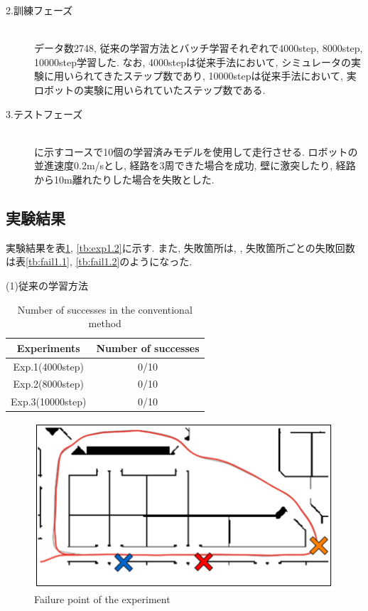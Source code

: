 \newpage
\begin{description}
  \item[2.訓練フェーズ]\mbox{}\\データ数2748, 従来の学習方法とバッチ学習それぞれで4000step, 8000step, 10000step学習した. なお, 4000stepは従来手法において, シミュレータの実験に用いられてきたステップ数であり, 10000stepは従来手法において, 実ロボットの実験に用いられていたステップ数である. 
\end{description}

\begin{description}
  \item[3.テストフェーズ]\mbox{}\\ に示すコースで10個の学習済みモデルを使用して走行させる. ロボットの並進速度0.2m/sとし, 経路を3周できた場合を成功, 壁に激突したり, 経路から10m離れたりした場合を失敗とした.
\end{description}

\subsection{実験結果}
実験結果を表\ref{tb:exp1.1}, \ref{tb:exp1.2}に示す. また, 失敗箇所は, , 失敗箇所ごとの失敗回数は表\ref{tb:fail1.1}, \ref{tb:fail1.2}のようになった. 

\newpage
\begin{description}
  \item [(1)従来の学習方法]
\end{description}

\begin{table}[h]
  \centering
  \begin{tabular}{|c|c|} \hline
    Experiments & Number of successes \\ \hline
    Exp.1(4000step) & 0/10 \\ \hline
    Exp.2(8000step) & 0/10 \\ \hline
    Exp.3(10000step) & 0/10 \\ \hline
  \end{tabular}
  \caption{Number of successes in the conventional method}
  \label{tb:exp1.1}
\end{table}

\begin{figure}[h]
  \centering
  \includegraphics[keepaspectratio, scale=0.5]{images/result1.png}
  \caption{Failure point of the experiment}
  \label{Fig:result1.1}
  \end{figure}

